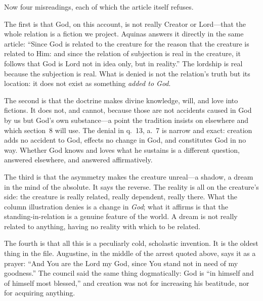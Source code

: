 Now four misreadings, each of which the article itself refuses.

The first is that God, on this account, is not really Creator or Lord---that the whole relation is a fiction we project. Aquinas answers it directly in the same article: ``Since God is related to the creature for the reason that the creature is related to Him: and since the relation of subjection is real in the creature, it follows that God is Lord not in idea only, but in reality.'' The lordship is real because the subjection is real. What is denied is not the relation's truth but its location: it does not exist as something \emph{added to God}.

The second is that the doctrine makes divine knowledge, will, and love into fictions. It does not, and cannot, because those are not accidents caused in God by us but God's own substance---a point the tradition insists on elsewhere and which section~8 will use. The denial in q.~13, a.~7 is narrow and exact: creation adds no accident to God, effects no change in God, and constitutes God in no way. Whether God knows and loves what he sustains is a different question, answered elsewhere, and answered affirmatively.

The third is that the asymmetry makes the creature unreal---a shadow, a dream in the mind of the absolute. It says the reverse. The reality is all on the creature's side: the creature is really related, really dependent, really there. What the column illustration denies is a change in \emph{God}; what it affirms is that the standing-in-relation is a genuine feature of the world. A dream is not really related to anything, having no reality with which to be related.

The fourth is that all this is a peculiarly cold, scholastic invention. It is the oldest thing in the file. Augustine, in the middle of the arrest quoted above, says it as a prayer: ``And You are the Lord my God, since You stand not in need of my goodness.'' The council said the same thing dogmatically: God is ``in himself and of himself most blessed,'' and creation was not for increasing his beatitude, nor for acquiring anything.

